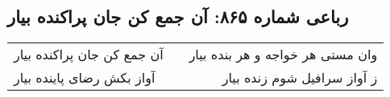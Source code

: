 \begin{center}
\section*{رباعی شماره ۸۶۵: آن جمع کن جان پراکنده بیار}
\label{sec:0865}
\begin{longtable}{l p{0.5cm} r}
آن جمع کن جان پراکنده بیار
&&
وان مستی هر خواجه و هر بنده بیار
\\
آواز بکش رضای پاینده بیار
&&
ز آواز سرافیل شوم زنده بیار
\\
\end{longtable}
\end{center}
